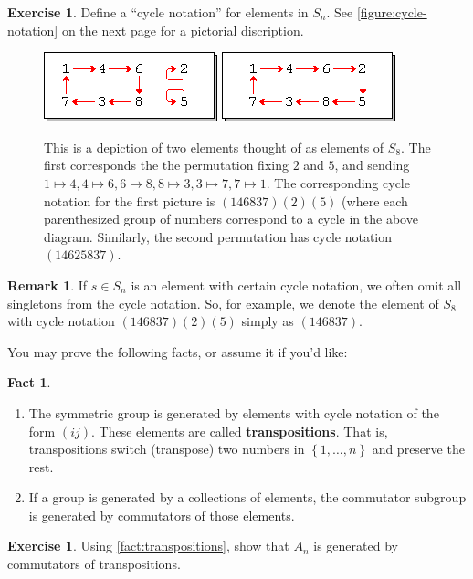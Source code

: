 \documentclass[reqno, 12pt, letter]{article}
\theoremstyle{plain}
\theoremstyle{definition}
\newtheorem{remark}[theorem]{Remark}
\newtheorem{exercise}[theorem]{Exercise}
\newtheorem{fact}[theorem]{Fact}
\theoremstyle{remark}
\numberwithin{equation}{section}
\begin{document}
\begin{exercise}
	\label{exercise:}
	Define a ``cycle notation'' for elements in $S_n$. See \autoref{figure:cycle-notation} on the next page for a pictorial discription.
			\begin{figure}[h!]
				 \includegraphics[scale=1.5]{cycle-1.png}	
				 \includegraphics[scale=1.5]{cycle-2.png}	
				\caption{This is a depiction of two elements thought of as elements of $S_8$. The first corresponds the the permutation fixing $2$ and $5$,
				and sending $1 \mapsto 4, 4 \mapsto 6, 6 \mapsto 8, 8\mapsto 3, 3 \mapsto 7, 7\mapsto 1$.
			The corresponding cycle notation for the first picture is $(146837)(2)(5)$ (where each parenthesized group of numbers
			correspond to a cycle in the above diagram. Similarly, the second permutation has cycle notation $(14625837)$.
			}
\label{figure:cycle-notation}\end{figure}
\end{exercise}
\begin{remark}
	\label{remark:}
	If $s \in S_n$ is an element with certain cycle notation, we often omit all singletons from the cycle notation.
	So, for example, we denote the element of $S_8$ with cycle notation $(146837)(2)(5)$ simply as $(146837)$.
\end{remark}

You may prove the following facts, or assume it if you'd like:
\begin{fact}
	\label{fact:transpositions}
	\begin{enumerate}
		\item The symmetric group is generated by elements with cycle notation of the form $(ij)$. These elements are called {\bf transpositions}. That is, transpositions switch (transpose) two numbers in $\left\{ 1, \ldots, n \right\}$ and preserve the rest.
		\item If a group is generated by a collections of elements, the commutator subgroup is generated by commutators of those elements.
	\end{enumerate}
\end{fact}
\begin{exercise}
	\label{exercise:commutators-generate}
	Using \autoref{fact:transpositions}, show that $A_n$ is generated by commutators of transpositions.
\end{exercise}
\end{document}
